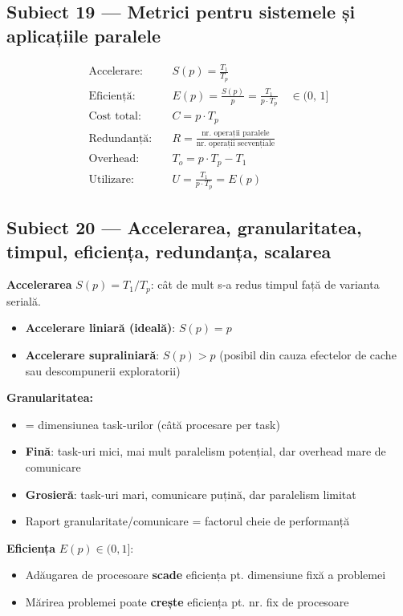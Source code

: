 \documentclass[a4paper,11pt]{article}
\newcommand{\subiect}[2]{\subsection{Subiect \textcolor{numcol}{#1} — #2}}
\begin{document}
\subiect{19}{Metrici pentru sistemele și aplicațiile paralele}

\begin{formulabox}
\begin{align*}
\text{Accelerare:} \quad & S(p) = \frac{T_1}{T_p} \\[5pt]
\text{Eficiență:} \quad & E(p) = \frac{S(p)}{p} = \frac{T_1}{p \cdot T_p} \quad\in (0,\,1] \\[5pt]
\text{Cost total:} \quad & C = p \cdot T_p \\[5pt]
\text{Redundanță:} \quad & R = \frac{\text{nr. operații paralele}}{\text{nr. operații secvențiale}} \\[5pt]
\text{Overhead:} \quad & T_o = p \cdot T_p - T_1 \\[5pt]
\text{Utilizare:} \quad & U = \frac{T_1}{p \cdot T_p} = E(p)
\end{align*}
\end{formulabox}

\subiect{20}{Accelerarea, granularitatea, timpul, eficiența, redundanța, scalarea}

\textbf{Accelerarea} $S(p) = T_1/T_p$: cât de mult s-a redus timpul față de varianta serială.
\begin{itemize}[noitemsep]
  \item \textbf{Accelerare liniară (ideală)}: $S(p) = p$
  \item \textbf{Accelerare supraliniară}: $S(p) > p$ (posibil din cauza efectelor de cache sau descompunerii exploratorii)
\end{itemize}

\textbf{Granularitatea:}
\begin{itemize}[noitemsep]
  \item = dimensiunea task-urilor (câtă procesare per task)
  \item \textbf{Fină}: task-uri mici, mai mult paralelism potențial, dar overhead mare de comunicare
  \item \textbf{Grosieră}: task-uri mari, comunicare puțină, dar paralelism limitat
  \item Raport granularitate/comunicare = factorul cheie de performanță
\end{itemize}

\textbf{Eficiența} $E(p) \in (0,1]$:
\begin{itemize}[noitemsep]
  \item Adăugarea de procesoare \textbf{scade} eficiența pt. dimensiune fixă a problemei
  \item Mărirea problemei poate \textbf{crește} eficiența pt. nr. fix de procesoare
\end{itemize}
\end{document}
